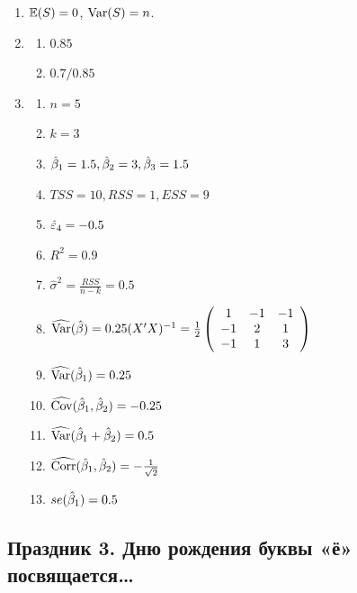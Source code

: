 \documentclass[12pt, a4paper]{article}\usepackage[]{graphicx}\usepackage[]{color}
\begin{document}
\begin{enumerate}
\item $\mathbb{E}(S) = 0$, $\operatorname{Var}(S) = n$.
\item
\begin{enumerate}
\item $0.85$
\item $0.7 / 0.85$
\end{enumerate}
\item
\begin{enumerate}
\item $n = 5$
\item $k = 3$
\item $\hat{\beta}_1 = 1.5, \hat{\beta}_2 = 3, \hat{\beta}_3 = 1.5$
\item $TSS = 10, RSS = 1, ESS = 9$
\item $\hat{\varepsilon}_4 = -0.5$
\item $R^2 = 0.9$
\item $\hat{\sigma}^2 = \frac{RSS}{n-k} = 0.5$
\item $\widehat{\operatorname{Var}}(\hat{\beta}) = 0.25 (X'X)^{-1}=\frac{1}{2}\left(
\begin{array}{ccc}
1 & -1 & -1 \\
-1 & 2 & 1 \\
-1 & 1 & 3
\end{array}\right)$
\item $\widehat{\operatorname{Var}}(\hat{\beta}_1) = 0.25$
\item $\widehat{\operatorname{Cov}}(\hat{\beta}_1,\hat{\beta}_2) = -0.25$
\item $\widehat{\operatorname{Var}}(\hat{\beta}_1+\hat{\beta}_2) = 0.5$
\item $\widehat{\operatorname{Corr}}(\hat{\beta}_1,\hat{\beta}_2) = -\frac{1}{\sqrt{2}}$
\item $se(\hat{\beta}_1) = 0.5$
\end{enumerate}
\end{enumerate}


\subsection{Праздник 3. Дню рождения буквы «ё» посвящается\ldots}
\end{document}
